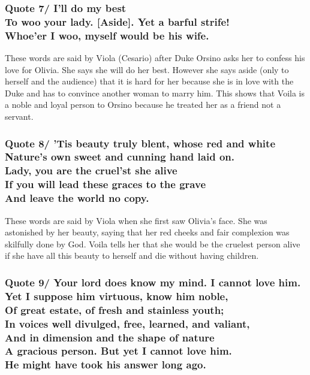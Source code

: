 \documentclass[12pt, a4paper]{article}
\begin{document}
\subsubsection*{Quote 7/
I’ll do my best\\
To woo your lady. [Aside]. Yet a barful strife!\\
Whoe’er I woo, myself would be his wife.
}

These words are said by Viola (Cesario) after Duke Orsino asks her
to confess his love for Olivia. She says she will do her best. However
she says aside (only to herself and the audience) that it is hard for
her because she is in love with the Duke and has to convince another 
woman to marry him. This shows that Voila is a noble and loyal
person to Orsino because he treated her as a friend not a servant.

\subsubsection*{Quote 8/
’Tis beauty truly blent, whose red and white\\
Nature’s own sweet and cunning hand laid on.\\
Lady, you are the cruel’st she alive\\
If you will lead these graces to the grave\\
And leave the world no copy.
}

These words are said by Viola when she first saw Olivia's face.
She was astonished by her beauty, saying that her red cheeks
and fair complexion was skilfully done by God. Voila tells her that 
she would be the cruelest person alive if she have all this 
beauty to herself and die without having children.

\subsubsection*{Quote 9/
Your lord does know my mind. I cannot love him.\\
Yet I suppose him virtuous, know him noble,\\
Of great estate, of fresh and stainless youth;\\
In voices well divulged, free, learned, and valiant,\\
And in dimension and the shape of nature\\
A gracious person. But yet I cannot love him.\\
He might have took his answer long ago.
}
\end{document}
